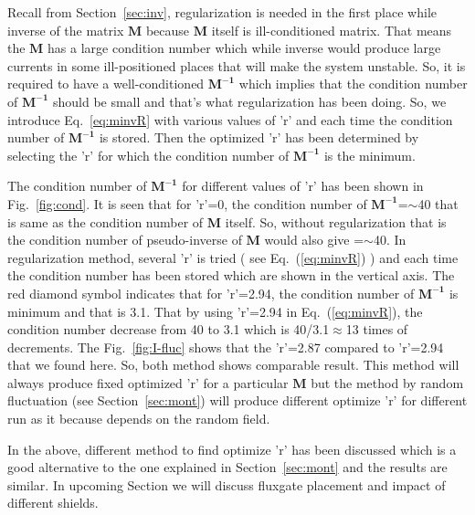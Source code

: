  Recall from Section~\ref{sec:inv}, regularization is needed in the first place while inverse of the matrix $\bm{M}$ because $\bm{M}$ itself is ill-conditioned matrix. That means the $\bm{M}$ has a large condition number which while inverse would produce large currents in some ill-positioned places that will make the system unstable. So, it is required to have a well-conditioned  $\bm{M^{-1}}$ which implies that the condition number of $\bm{M^{-1}}$ should be small and that's what regularization has been doing. So, we introduce Eq.~\ref{eq:minvR} with various values of 'r' and each time the condition number of $\bm{M^{-1}}$ is stored. Then the optimized 'r'  has been determined by selecting the 'r' for which the condition number of $\bm{M^{-1}}$ is the minimum.
 
 The condition number of $\bm{M^{-1}}$ for different values of 'r' has been shown in Fig.~\ref{fig:cond}. It is seen that for 'r'=0, the condition number of $\bm{M^{-1}}$=$\sim$40 that is same as the condition number of $\bm{M}$ itself. So, without regularization that is the condition number of pseudo-inverse of $\bm{M}$ would also give =$\sim$40. In regularization method, several 'r' is tried ( see Eq.~(\ref{eq:minvR}) ) and each time the condition number has been stored which are shown in the vertical axis. The red diamond symbol indicates that for 'r'=2.94, the condition number of $\bm{M^{-1}}$ is minimum and that is 3.1. That by using 'r'=2.94 in Eq.~(\ref{eq:minvR}), the condition number decrease from 40 to 3.1 which is 40/3.1$\approx$13 times of decrements. The Fig.~\ref{fig:I-fluc} shows that the 'r'=2.87 compared to 'r'=2.94 that we found here. So, both method shows comparable result. This method will always produce fixed optimized 'r' for a particular  $\bm{M}$ but the method by random fluctuation (see Section~\ref{sec:mont}) will produce different optimize 'r' for different run as it because depends on the random field.

 

\FloatBarrier

In the above, different method to find optimize 'r' has been discussed which is a good alternative to the one explained in Section~\ref{sec:mont} and the results are similar. In upcoming Section we will discuss fluxgate placement and impact of different shields.


